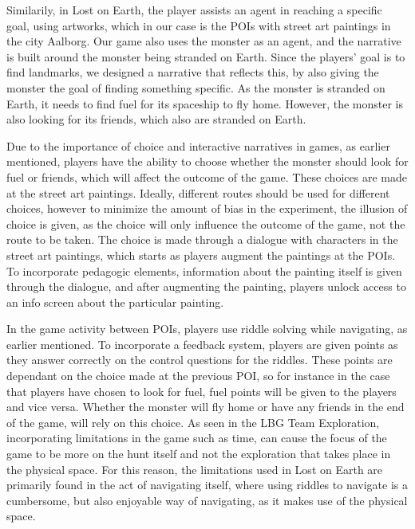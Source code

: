 Similarily, in Lost on Earth, the player assists an agent in reaching a specific goal, using artworks, which in our case is the POIs with street art paintings in the city Aalborg. Our game also uses the monster as an agent, and the narrative is built around the monster being stranded on Earth. Since the players' goal is to find landmarks, we designed a narrative that reflects this, by also giving the monster the goal of finding something specific. As the monster is stranded on Earth, it needs to find fuel for its spaceship to fly home. However, the monster is also looking for its friends, which also are stranded on Earth.

Due to the importance of choice and interactive narratives in games, as earlier mentioned, players have the ability to choose whether the monster should look for fuel or friends, which will affect the outcome of the game. These choices are made at the street art paintings. Ideally, different routes should be used for different choices, however to minimize the amount of bias in the experiment, the illusion of choice is given, as the choice will only influence the outcome of the game, not the route to be taken. The choice is made through a dialogue with characters in the street art paintings, which starts as players augment the paintings at the POIs. To incorporate pedagogic elements, information about the painting itself is given through the dialogue, and after augmenting the painting, players unlock access to an info screen about the particular painting. 

In the game activity between POIs, players use riddle solving while navigating, as earlier mentioned. To incorporate a feedback system, players are given points as they answer correctly on the control questions for the riddles. These points are dependant on the choice made at the previous POI, so for instance in the case that players have chosen to look for fuel, fuel points will be given to the players and vice versa. Whether the monster will fly home or have any friends in the end of the game, will rely on this choice. As seen in the LBG Team Exploration, incorporating limitations in the game such as time, can cause the focus of the game to be more on the hunt itself and not the exploration that takes place in the physical space. For this reason, the limitations used in Lost on Earth are primarily found in the act of navigating itself, where using riddles to navigate is a cumbersome, but also enjoyable way of navigating, as it makes use of the physical space.